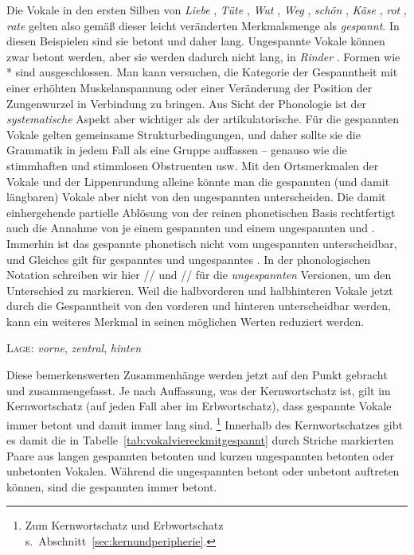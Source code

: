 Die Vokale in den ersten Silben von \textit{Liebe} \textipa{[li:b@]}, \textit{Tüte} \textipa{[ty:t@]}, \textit{Wut} \textipa{[vu:t]}, \textit{Weg} \textipa{[ve:k]}, \textit{schön} \textipa{[S\o:n]}, \textit{Käse} \textipa{[kE:z@]}, \textit{rot} \textipa{[ro:t]}, \textit{rate} \textipa{[Ka:t@]} gelten also gemäß dieser leicht veränderten Merkmalsmenge als \textit{gespannt}.
In diesen Beispielen sind sie betont und daher lang.
Ungespannte Vokale können zwar betont werden, aber sie werden dadurch nicht lang, \zB in \textit{Rinder} \textipa{[KInd5]}.
Formen wie *\textipa{[KI:nd5]} sind ausgeschlossen.
Man kann versuchen, die Kategorie der Gespanntheit mit einer erhöhten Muskelanspannung oder einer Veränderung der Position der Zungenwurzel in Verbindung zu bringen.
Aus Sicht der Phonologie ist der \textit{systematische} Aspekt aber wichtiger als der artikulatorische.
Für die gespannten Vokale gelten gemeinsame Strukturbedingungen, und daher sollte sie die Grammatik in jedem Fall als eine Gruppe auffassen -- genauso wie die stimmhaften und stimmlosen Obstruenten usw.
Mit den Ortsmerkmalen der Vokale und der Lippenrundung alleine könnte man die gespannten (und damit längbaren) Vokale aber nicht von den ungespannten unterscheiden.
Die damit einhergehende partielle Ablösung von der reinen phonetischen Basis rechtfertigt auch die Annahme von je einem gespannten und einem ungespannten \textipa{[a]} und \textipa{[E]}.
Immerhin ist das gespannte \textipa{[a]} phonetisch nicht vom ungespannten \textipa{[a]} unterscheidbar, und Gleiches gilt für gespanntes und ungespanntes \textipa{[E]}.
In der phonologischen Notation schreiben wir hier // und // für die \textit{ungespannten} Versionen, um den Unterschied zu markieren.
Weil die halbvorderen und halbhinteren Vokale jetzt durch die Gespanntheit von den vorderen und hinteren unterscheidbar werden, kann ein weiteres Merkmal in seinen möglichen Werten reduziert werden.

\begin{exe}
  \ex \textsc{Lage}: \textit{vorne}, \textit{zentral}, \textit{hinten}
\end{exe}

Diese bemerkenswerten Zusammenhänge werden jetzt auf den Punkt gebracht und zusammengefasst.
Je nach Auffassung, was der Kernwortschatz ist, gilt im Kernwortschatz (auf jeden Fall aber im Erbwortschatz), dass gespannte Vokale immer betont und damit immer lang sind.%
\footnote{Zum Kernwortschatz und Erbwortschatz s.\ Abschnitt~\ref{sec:kernundperipherie}.}
Innerhalb des Kernwortschatzes gibt es damit die in Tabelle~\ref{tab:vokalviereckmitgespannt} durch Striche markierten Paare aus langen gespannten betonten und kurzen ungespannten betonten oder unbetonten Vokalen.
Während die ungespannten betont oder unbetont auftreten können, sind die gespannten immer betont.

